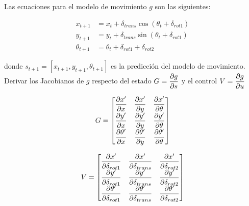 \documentclass[tp]{lcc}
\begin{document}
    Las ecuaciones para el modelo de movimiento $g$ son las siguientes:
    
    \begin{align*}
        x_{t+1} &= x_{t} + \delta_{trans} \cos(\theta_{t} + \delta_{rot1})\\
        y_{t+1} &= y_{t} + \delta_{trans} \sin(\theta_{t} + \delta_{rot1})\\
        \theta_{t+1} &= \theta_{t} + \delta_{rot1} + \delta_{rot2}
    \end{align*}

    donde $s_{t+1} = [x_{t+1}, y_{t+1}, \theta_{t+1}]$ es la predicción del modelo de movimiento. Derivar los Jacobianos de $g$ respecto del estado $G = \dfrac{\partial g}{\partial s}$ y el control $V = \dfrac{\partial g}{\partial u}$
    
    \noindent
    \begin{minipage}[t]{.5\textwidth}
    \begin{equation*}
        G =
        \begin{bmatrix}
            \dfrac{\partial x^{\prime}}{\partial x} & \dfrac{\partial x^{\prime}}{\partial y} & \dfrac{\partial x^{\prime}}{\partial \theta}\\
            \dfrac{\partial y^{\prime}}{\partial x} & \dfrac{\partial y^{\prime}}{\partial y} & \dfrac{\partial y^{\prime}}{\partial \theta}\\
            \dfrac{\partial \theta^{\prime}}{\partial x} & \dfrac{\partial \theta^{\prime}}{\partial y} & \dfrac{\partial \theta^{\prime}}{\partial \theta}
        \end{bmatrix}
\end{equation*}
    \end{minipage}%
    \begin{minipage}[t]{.5\textwidth}
        \begin{equation*}
            V =
            \begin{bmatrix}
                \dfrac{\partial x^{\prime}}{\partial \delta_{rot1}} & \dfrac{\partial x^{\prime}}{\partial \delta_{trans}} & \dfrac{\partial x^{\prime}}{\partial \delta_{rot2}}\\
                \dfrac{\partial y^{\prime}}{\partial \delta_{rot1}} & \dfrac{\partial y^{\prime}}{\partial \delta_{trans}} & \dfrac{\partial y^{\prime}}{\partial \delta_{rot2}}\\
                \dfrac{\partial \theta^{\prime}}{\partial \delta_{rot1}} & \dfrac{\partial \theta^{\prime}}{\partial \delta_{trans}} & \dfrac{\partial \theta^{\prime}}{\partial \delta_{rot2}}
            \end{bmatrix}
        \end{equation*}
    \end{minipage}
    
\end{document}
